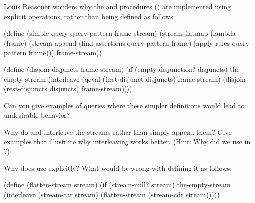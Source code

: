 \begin{exercise}
	\label{Exercise 4.71}
	Louis Reasoner wonders why the  and  procedures () are implemented using explicit  operations, rather than being defined as follows:
	\begin{scheme}
	  (define (simple-query query-pattern frame-stream)
	    (stream-flatmap
	     (lambda (frame)
	       (stream-append
	        (find-assertions query-pattern frame)
	        (apply-rules query-pattern frame)))
	     frame-stream))

	  (define (disjoin disjuncts frame-stream)
	    (if (empty-disjunction? disjuncts)
	        the-empty-stream
	        (interleave
	         (qeval (first-disjunct disjuncts)
	                frame-stream)
	         (disjoin (rest-disjuncts disjuncts)
	                  frame-stream))))
	\end{scheme}
	Can you give examples of queries where these simpler definitions would lead to
	undesirable behavior?
\end{exercise}



\begin{exercise}
	\label{Exercise 4.72}
	Why do  and  interleave the streams rather than simply append them?
	Give examples that illustrate why interleaving works better.
	(Hint: Why did we use  in ?)
\end{exercise}

\begin{exercise}
	\label{Exercise 4.73}
	Why does 
	use  explicitly?  What would be wrong with defining it as follows:
	\begin{scheme}
	  (define (flatten-stream stream)
	    (if (stream-null? stream)
	        the-empty-stream
	        (interleave
	         (stream-car stream)
	         (flatten-stream (stream-cdr stream)))))
	\end{scheme}
\end{exercise}



